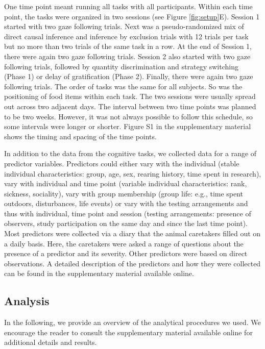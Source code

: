 \documentclass[
  man,floatsintext]{apa6}
\begin{document}
One time point meant running all tasks with all participants. Within each time point, the tasks were organized in two sessions (see Figure \ref{fig:setup}E). Session 1 started with two gaze following trials. Next was a pseudo-randomized mix of direct causal inference and inference by exclusion trials with 12 trials per task but no more than two trials of the same task in a row. At the end of Session 1, there were again two gaze following trials. Session 2 also started with two gaze following trials, followed by quantity discrimination and strategy switching (Phase 1) or delay of gratification (Phase 2). Finally, there were again two gaze following trials. The order of tasks was the same for all subjects. So was the positioning of food items within each task. The two sessions were usually spread out across two adjacent days. The interval between two time points was planned to be two weeks. However, it was not always possible to follow this schedule, so some intervals were longer or shorter. Figure S1 in the supplementary material shows the timing and spacing of the time points.

In addition to the data from the cognitive tasks, we collected data for a range of predictor variables. Predictors could either vary with the individual (stable individual characteristics: group, age, sex, rearing history, time spent in research), vary with individual and time point (variable individual characteristics: rank, sickness, sociality), vary with group membership (group life: e.g., time spent outdoors, disturbances, life events) or vary with the testing arrangements and thus with individual, time point and session (testing arrangements: presence of observers, study participation on the same day and since the last time point). Most predictors were collected via a diary that the animal caretakers filled out on a daily basis. Here, the caretakers were asked a range of questions about the presence of a predictor and its severity. Other predictors were based on direct observations. A detailed description of the predictors and how they were collected can be found in the supplementary material available online.

\hypertarget{analysis}{%
\subsection{Analysis}\label{analysis}}

In the following, we provide an overview of the analytical procedures we used. We encourage the reader to consult the supplementary material available online for additional details and results.
\end{document}

